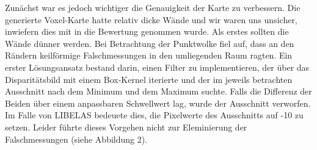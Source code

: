 \documentclass[12pt,titlepage, a4paper]{article}
\begin{document}
Zunächst war es jedoch wichtiger die Genauigkeit der Karte zu verbessern. Die generierte Voxel-Karte hatte relativ dicke Wände und wir waren uns unsicher, inwiefern dies mit in die Bewertung genommen wurde. Als erstes sollten die Wände dünner werden. Bei Betrachtung der Punktwolke fiel auf, dass an den Rändern keilförmige Falschmessungen in den umliegenden Raum ragten. Ein erster Lösungsansatz bestand darin, einen Filter zu implementieren, der über das Disparitätsbild mit einem Box-Kernel iterierte und der im jeweils betrachten Ausschnitt nach dem Minimum und dem Maximum suchte. Falls die Differenz der Beiden über einem anpassbaren Schwellwert lag, wurde der Ausschnitt verworfen. Im Falle von LIBELAS bedeuete dies, die Pixelwerte des Ausschnitts auf -10 zu setzen. Leider führte dieses Vorgehen nicht zur Eleminierung der Falschmessungen (siehe Abbildung 2).
\end{document}
